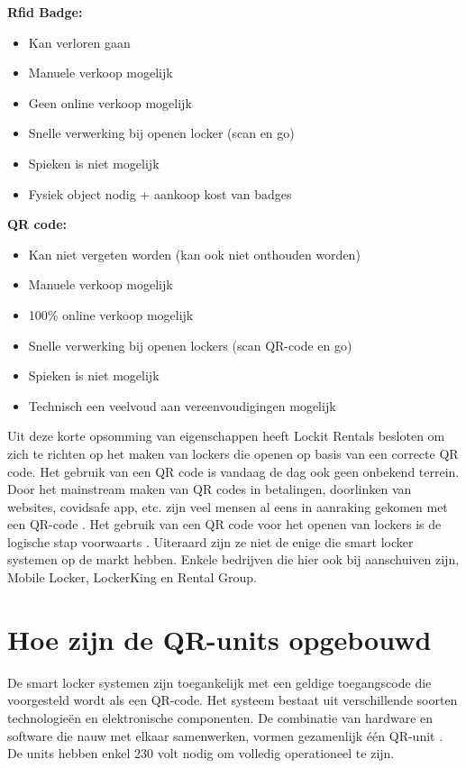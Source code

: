 \textbf{Rfid Badge:}
\begin{itemize}
    \item Kan verloren gaan
    \item Manuele verkoop mogelijk
    \item Geen online verkoop mogelijk
    \item Snelle verwerking bij openen locker (scan en go)
    \item Spieken is niet mogelijk
    \item Fysiek object nodig + aankoop kost van badges    
\end{itemize}

\textbf{QR  code:}
\begin{itemize}
    \item Kan niet vergeten worden (kan ook niet onthouden worden)
    \item Manuele verkoop mogelijk
    \item 100\% online verkoop mogelijk
    \item Snelle verwerking bij openen lockers (scan QR-code en go)
    \item Spieken is niet mogelijk
    \item Technisch een veelvoud aan vereenvoudigingen mogelijk    
\end{itemize}

Uit deze korte opsomming van eigenschappen heeft Lockit Rentals besloten om zich te richten op het maken van lockers die openen op basis van een correcte QR code. Het gebruik van een QR code is vandaag de dag ook geen onbekend terrein. Door het mainstream maken van QR codes in betalingen, doorlinken van websites, covidsafe app, etc. zijn veel mensen al eens in aanraking gekomen met een QR-code \autocite{Belle2023}. Het gebruik van een QR code voor het openen van lockers is de logische stap voorwaarts \autocite{Lo2014}.
Uiteraard zijn ze niet de enige die smart locker systemen op de markt hebben. Enkele bedrijven die hier ook bij aanschuiven zijn, Mobile Locker, LockerKing en Rental Group.

\section{Hoe zijn de QR-units opgebouwd}%
\label{sec:QR-units}
De smart locker systemen zijn toegankelijk met een geldige toegangscode die voorgesteld wordt als een QR-code. Het systeem bestaat uit verschillende soorten technologieën en elektronische componenten. De combinatie van hardware en software die nauw met elkaar samenwerken, vormen gezamenlijk één QR-unit \autocite{Jadhav2016} . De units hebben enkel 230 volt nodig om volledig operationeel te zijn. 

